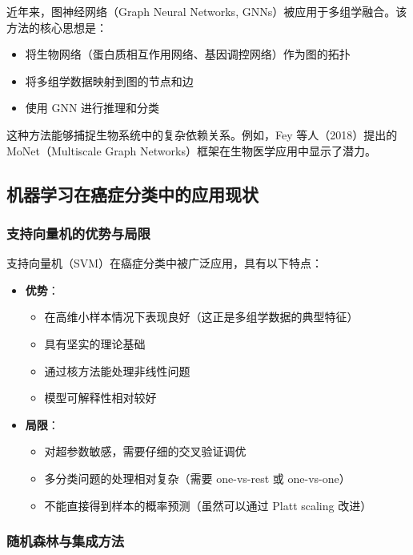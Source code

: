 近年来，图神经网络（Graph Neural Networks, GNNs）被应用于多组学融合。该方法的核心思想是：

\begin{itemize}
    \item 将生物网络（蛋白质相互作用网络、基因调控网络）作为图的拓扑
    \item 将多组学数据映射到图的节点和边
    \item 使用 GNN 进行推理和分类
\end{itemize}

这种方法能够捕捉生物系统中的复杂依赖关系。例如，Fey 等人（2018）提出的 MoNet（Multiscale Graph Networks）框架在生物医学应用中显示了潜力。

\subsection{机器学习在癌症分类中的应用现状}

\subsubsection{支持向量机的优势与局限}

支持向量机（SVM）在癌症分类中被广泛应用，具有以下特点：

\begin{itemize}
    \item \textbf{优势}：
    \begin{itemize}
        \item 在高维小样本情况下表现良好（这正是多组学数据的典型特征）
        \item 具有坚实的理论基础
        \item 通过核方法能处理非线性问题
        \item 模型可解释性相对较好
    \end{itemize}
    
    \item \textbf{局限}：
    \begin{itemize}
        \item 对超参数敏感，需要仔细的交叉验证调优
        \item 多分类问题的处理相对复杂（需要 one-vs-rest 或 one-vs-one）
        \item 不能直接得到样本的概率预测（虽然可以通过 Platt scaling 改进）
    \end{itemize}
\end{itemize}

\subsubsection{随机森林与集成方法}

